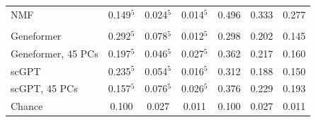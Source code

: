 \begin{table}[!ht]
\begin{tabular}{lcccccc}
NMF & 0.149$^{5}$ & 0.024$^{5}$ & 0.014$^{5}$ & 0.496 & 0.333 & 0.277 \\
\addlinespace
\multicolumn{7}{l}{\emph{Foundation-model embeddings}} \\
Geneformer & 0.292$^{5}$ & 0.078$^{5}$ & 0.012$^{5}$ & 0.298 & 0.202 & 0.145 \\
Geneformer, 45 PCs & 0.197$^{5}$ & 0.046$^{5}$ & 0.027$^{5}$ & 0.362 & 0.217 & 0.160 \\
scGPT & 0.235$^{5}$ & 0.054$^{5}$ & 0.016$^{5}$ & 0.312 & 0.188 & 0.150 \\
scGPT, 45 PCs & 0.157$^{5}$ & 0.076$^{5}$ & 0.026$^{5}$ & 0.376 & 0.229 & 0.193 \\
\addlinespace
Chance & 0.100 & 0.027 & 0.011 & 0.100 & 0.027 & 0.011 \\
\bottomrule
\end{tabular}
\end{table}
